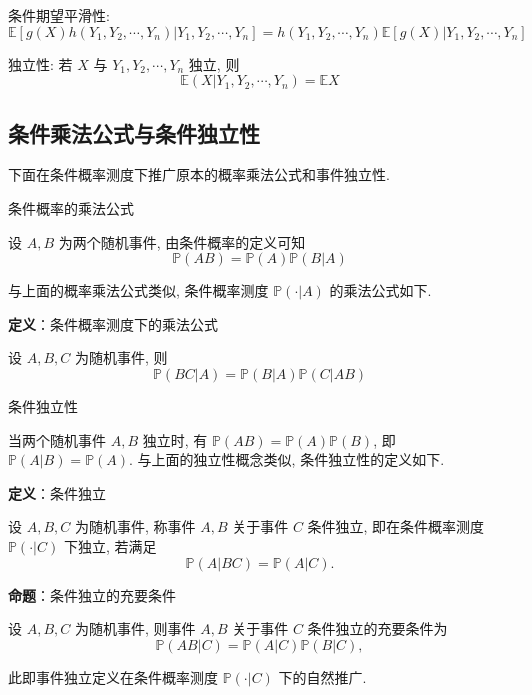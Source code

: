 \documentclass[openany]{ctexbook}
\theoremstyle{kaiti}
\theoremstyle{normal}
\begin{document}
条件期望平滑性:
\begin{equation}
  \mathbb{E}[g(X)h(Y_1,Y_2,\cdots,Y_n)|Y_1,Y_2,\cdots,Y_n]=h(Y_1,Y_2,\cdots,Y_n)\mathbb{E}[g(X)|Y_1,Y_2,\cdots,Y_n]
\end{equation}

独立性: 若 $X$ 与 $Y_1,Y_2,\cdots,Y_n$ 独立, 则
\begin{equation}
  \mathbb{E}(X|Y_1,Y_2,\cdots,Y_n)=\mathbb{E}X
\end{equation}

\subsection{条件乘法公式与条件独立性}

下面在条件概率测度下推广原本的概率乘法公式和事件独立性.

条件概率的乘法公式

设 $A,B$ 为两个随机事件, 由条件概率的定义可知
\begin{equation}
  \mathbb{P}(AB)=\mathbb{P}(A)\mathbb{P}(B|A)
\end{equation}

与上面的概率乘法公式类似, 条件概率测度 $\mathbb{P}(\cdot|A)$ 的乘法公式如下. 

\textbf{定义}：条件概率测度下的乘法公式

设 $A,B,C$ 为随机事件, 则
\begin{equation}
  \mathbb{P}(BC|A)=\mathbb{P}(B|A)\mathbb{P}(C|AB)
\end{equation}

条件独立性

当两个随机事件 $A,B$ 独立时, 有 $\mathbb{P}(AB)=\mathbb{P}(A)\mathbb{P}(B)$, 即 $\mathbb{P}(A|B)=\mathbb{P}(A)$. 与上面的独立性概念类似, 条件独立性的定义如下. 

\textbf{定义}：条件独立

设 $A,B,C$ 为随机事件, 称事件 $A,B$ 关于事件 $C$ 条件独立, 即在条件概率测度 $\mathbb{P}(\cdot|C)$ 下独立, 若满足 
\begin{equation}
  \mathbb{P}(A|BC)=\mathbb{P}(A|C).
\end{equation}

\textbf{命题}：条件独立的充要条件

设 $A,B,C$ 为随机事件, 则事件 $A,B$ 关于事件 $C$ 条件独立的充要条件为
\begin{equation}
  \mathbb{P}(AB|C)=\mathbb{P}(A|C)\mathbb{P}(B|C),
\end{equation}

此即事件独立定义在条件概率测度 $\mathbb{P}(\cdot|C)$ 下的自然推广.
\end{document}
